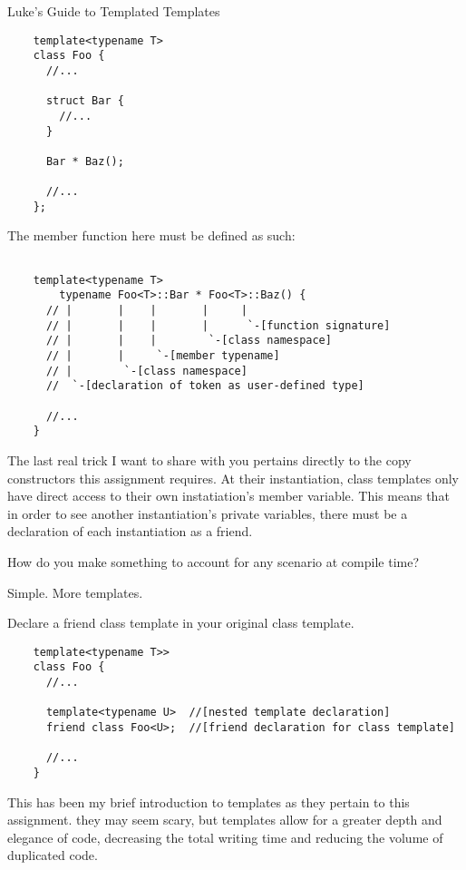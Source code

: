 \begin{section}{Luke's Guide to Templated Templates}
 \begin{verbatim}
    template<typename T>
    class Foo {
      //...

      struct Bar {
        //...
      }

      Bar * Baz();

      //...
    };
 \end{verbatim}

 The member function here must be defined as such:
 \begin{verbatim}

    template<typename T>
		typename Foo<T>::Bar * Foo<T>::Baz() {
      // |       |    |       |     |
      // |       |    |       |      `-[function signature]
      // |       |    |        `-[class namespace]
      // |       |     `-[member typename]
      // |        `-[class namespace]
      //  `-[declaration of token as user-defined type]

      //...
    }
 \end{verbatim}

 \pagebreak
 \indent The last real trick I want to share with you pertains directly to the copy
 constructors this assignment requires. At their instantiation, class templates
 only have direct access to their own instatiation's member variable. This
 means that in order to see another instantiation's private variables, there
 must be a declaration of each instantiation as a friend.

 \begin{displayquote}
	 How do you make something to account for any scenario at compile time?

	 Simple. More templates.

	 Declare a friend class template in your original class template.

	 \begin{verbatim}
    template<typename T>>
    class Foo {
      //...

      template<typename U>  //[nested template declaration]
      friend class Foo<U>;  //[friend declaration for class template]

      //...
    }
	 \end{verbatim}
 \end{displayquote}

 \indent This has been my brief introduction to templates as they pertain to this
 assignment. they may seem scary, but templates allow for a greater depth and
 elegance of code, decreasing the total writing time and reducing the volume of
 duplicated code.

\end{section}
